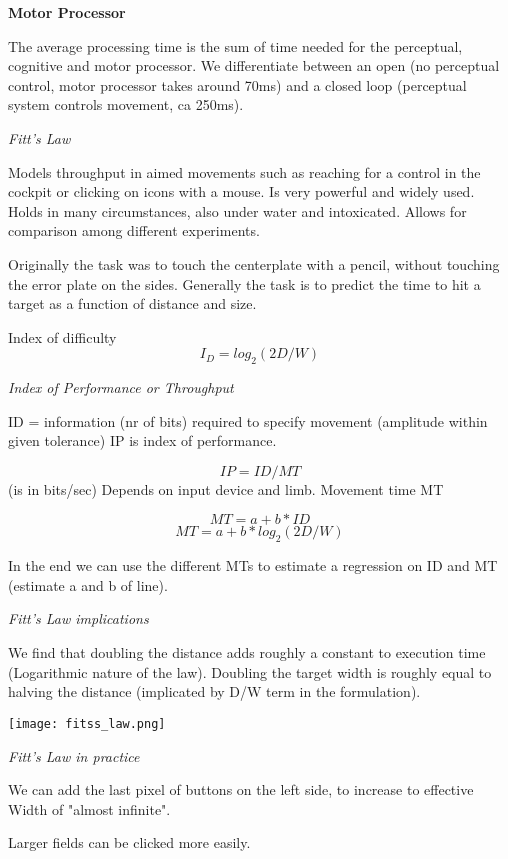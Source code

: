 \textbf{Motor Processor} \smallskip

The average processing time is the sum of time needed for the perceptual, cognitive and motor processor. We differentiate between an open (no perceptual control, motor processor takes around 70ms) and a closed loop (perceptual system controls movement, ca 250ms). \medskip

\textit{Fitt's Law} \smallskip

Models throughput in aimed movements such as reaching for a control in the cockpit or clicking on icons with a mouse. Is very powerful and widely used. Holds in many circumstances, also under water and intoxicated. Allows for comparison among different experiments. \medskip

Originally the task was to touch the centerplate with a pencil, without touching the error plate on the sides. Generally the task is to predict the time to hit a target as a function of distance and size. \medskip

Index of difficulty
$$I_D = log_2(2D/W)$$

\textit{Index of Performance or Throughput} \smallskip

ID = information (nr of bits) required to specify movement (amplitude within given tolerance)\smallskip
IP is index of performance. 

$$IP = ID / MT $$(is in bits/sec)
Depends on input device and limb. \smallskip
Movement time MT

$$MT = a + b * ID$$
$$MT = a + b *log_2(2D/W)$$

In the end we can use the different MTs to estimate a regression on ID and MT (estimate a and b of line). \medskip

\textit{Fitt's Law implications} \smallskip

We find that doubling the distance adds roughly a constant to execution time (Logarithmic nature of the law). Doubling the target width is roughly equal to halving the distance (implicated by D/W term in the formulation). \medskip

\begin{center}
	\texttt{[image: fitss\_law.png]}
\end{center}

\textit{Fitt's Law in practice} \smallskip

We can add the last pixel of buttons on the left side, to increase to effective Width of "almost infinite". \smallskip

Larger fields can be clicked more easily. \medskip

